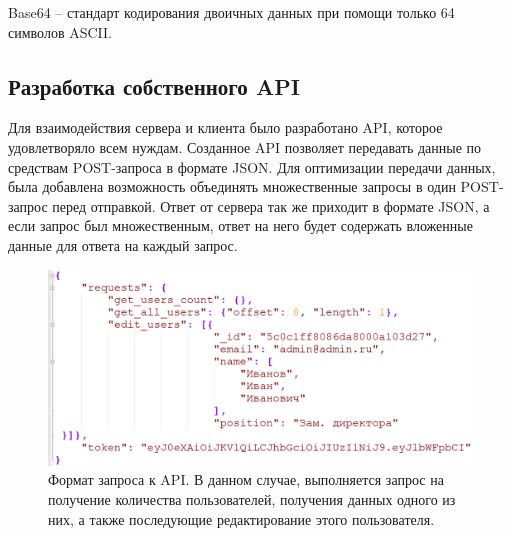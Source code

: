 \documentclass[14pt, a4paper]{extarticle}
\begin{document}
    Base64 – стандарт кодирования двоичных данных при помощи только 64 символов ASCII.


    \clearpage
    \subsection{Разработка собственного API}
    Для взаимодействия сервера и клиента было разработано API, которое удовлетворяло всем нуждам. Созданное API позволяет передавать данные по средствам POST-запроса в формате JSON. Для оптимизации передачи данных, была добавлена возможность объединять множественные запросы в один POST-запрос перед отправкой. Ответ от сервера так же приходит в формате JSON, а если запрос был множественным, ответ на него будет содержать вложенные данные для ответа на каждый запрос.
    
    \begin{figure}[h]
        \centering
        \includegraphics[width=1\linewidth]{img/req.png}
        \caption{Формат запроса к API. В данном случае, выполняется запрос на получение количества пользователей, получения данных одного из них, а также последующие редактирование этого пользователя.}
        \label{fig:req}
    \end{figure}
    
\end{document}
